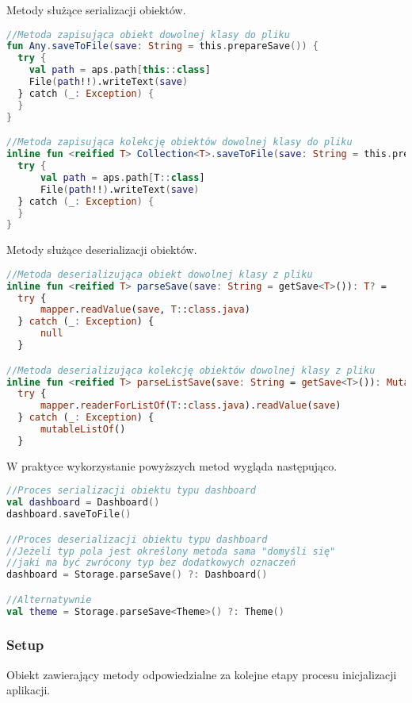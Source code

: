 \vspace{1em}

Metody służące serializacji obiektów.

\begin{lstlisting}[language=Kotlin]
//Metoda zapisująca obiekt dowolnej klasy do pliku
fun Any.saveToFile(save: String = this.prepareSave()) {
  try {
    val path = aps.path[this::class]
    File(path!!).writeText(save)
  } catch (_: Exception) {
  }
}

//Metoda zapisująca kolekcję obiektów dowolnej klasy do pliku
inline fun <reified T> Collection<T>.saveToFile(save: String = this.prepareSave()) {
  try {
      val path = aps.path[T::class]
      File(path!!).writeText(save)
  } catch (_: Exception) {
  }
}
\end{lstlisting}

\newpage

Metody służące deserializacji obiektów.

\begin{lstlisting}[language=Kotlin]
//Metoda deserializująca obiekt dowolnej klasy z pliku
inline fun <reified T> parseSave(save: String = getSave<T>()): T? =
  try {
      mapper.readValue(save, T::class.java)
  } catch (_: Exception) {
      null
  }

//Metoda deserializująca kolekcję obiektów dowolnej klasy z pliku
inline fun <reified T> parseListSave(save: String = getSave<T>()): MutableList<T> =
  try {
      mapper.readerForListOf(T::class.java).readValue(save)
  } catch (_: Exception) {
      mutableListOf()
  }
\end{lstlisting}

\vspace{1em}

W praktyce wykorzystanie powyższych metod wygląda następująco.

\begin{lstlisting}[language=Kotlin]
//Proces serializacji obiektu typu dashboard
val dashboard = Dashboard()
dashboard.saveToFile()

//Proces deserializacji obiektu typu dashboard
//Jeżeli typ pola jest określony metoda sama "domyśli się"
//jaki ma być zwrócony typ bez dodatkowych oznaczeń
dashboard = Storage.parseSave() ?: Dashboard()

//Alternatywnie
val theme = Storage.parseSave<Theme>() ?: Theme()
\end{lstlisting}

\newpage

\subsubsection{Setup}
Obiekt zawierający metody odpowiedzialne za kolejne etapy procesu inicjalizacji aplikacji.

